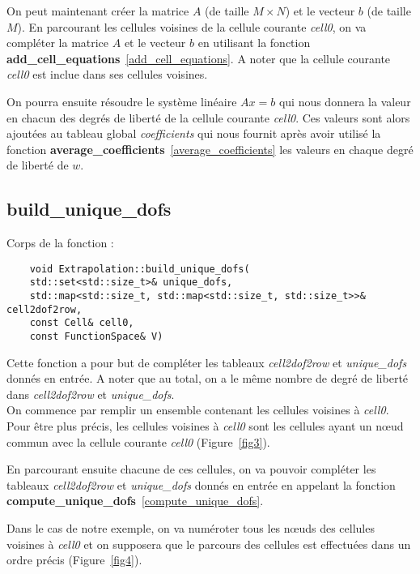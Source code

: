 On peut maintenant créer la matrice $A$ (de taille $M\times N$) et le vecteur $b$ (de taille $M$). En parcourant les cellules voisines de la cellule courante \textit{cell0}, on va compléter la matrice $A$ et le vecteur $b$ en utilisant la fonction \textbf{add\_cell\_equations}~\ref{add_cell_equations}. A noter que la cellule courante \textit{cell0} est inclue dans ses cellules voisines.

On pourra ensuite résoudre le système linéaire $Ax=b$ qui nous donnera la valeur en chacun des degrés de liberté de la cellule courante \textit{cell0}. Ces valeurs sont alors ajoutées au tableau global \textit{coefficients} qui nous fournit après avoir utilisé la fonction \textbf{average\_coefficients}~\ref{average_coefficients} les valeurs en chaque degré de liberté de $w$.

\subsection{build\_unique\_dofs}
\label{build_unique_dofs}

Corps de la fonction :

\begin{lstlisting}
	void Extrapolation::build_unique_dofs(
	std::set<std::size_t>& unique_dofs,
	std::map<std::size_t, std::map<std::size_t, std::size_t>>& cell2dof2row,
	const Cell& cell0,
	const FunctionSpace& V)
\end{lstlisting}

Cette fonction a pour but de compléter les tableaux \textit{cell2dof2row} et \textit{unique\_dofs} donnés en entrée. A noter que au total, on a le même nombre de degré de liberté dans \textit{cell2dof2row} et \textit{unique\_dofs}.\\

On commence par remplir un ensemble contenant les cellules voisines à \textit{cell0}. Pour être plus précis, les cellules voisines à \textit{cell0} sont les cellules ayant un nœud commun avec la cellule courante \textit{cell0} (Figure~\ref{fig3}).

En parcourant ensuite chacune de ces cellules, on va pouvoir compléter les tableaux \textit{cell2dof2row} et \textit{unique\_dofs} donnés en entrée en appelant la fonction \textbf{compute\_unique\_dofs}~\ref{compute_unique_dofs}. 

Dans le cas de notre exemple, on va numéroter tous les nœuds des cellules voisines à \textit{cell0} et on supposera que le parcours des cellules est effectuées dans un ordre précis (Figure~\ref{fig4}).


